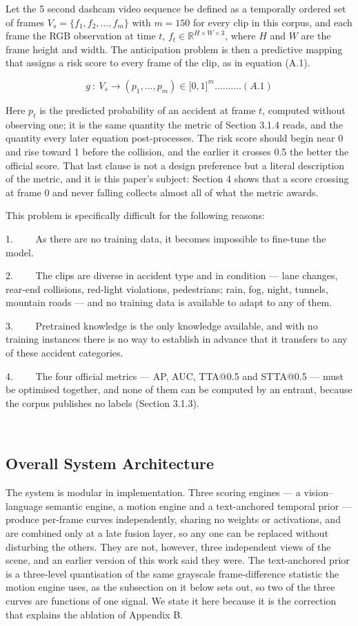 Let the 5 second dashcam video sequence be defined as a temporally ordered set of frames \(V_{s} = \{ f_{1},f_{2},\ldots,f_{m}\}\) with \(m = 150\) for every clip in this corpus, and each frame the RGB observation at time \(t\), \(f_{t} \in \mathbb{R}^{H \times W \times 3}\), where \(H\) and \(W\) are the frame height and width. The anticipation problem is then a predictive mapping that assigns a risk score to every frame of the clip, as in equation (A.1).

\[g\ :\ V_{s} \longrightarrow \left( p_{1},\ldots,p_{m} \right) \in \lbrack 0,1\rbrack^{m}\ldots\ldots\ldots.(A.1)\]

Here \(p_{t}\) is the predicted probability of an accident at frame \(t\), computed without observing one; it is the same quantity the metric of Section 3.1.4 reads, and the quantity every later equation post-processes. The risk score should begin near 0 and rise toward 1 before the collision, and the earlier it crosses 0.5 the better the official score. That last clause is not a design preference but a literal description of the metric, and it is this paper's subject: Section 4 shows that a score crossing at frame 0 and never falling collects almost all of what the metric awards.

This problem is specifically difficult for the following reasons:

1.~~~~ As there are no training data, it becomes impossible to fine-tune the model.

2.~~~~ The clips are diverse in accident type and in condition --- lane changes, rear-end collisions, red-light violations, pedestrians; rain, fog, night, tunnels, mountain roads --- and no training data is available to adapt to any of them.

3.~~~~ Pretrained knowledge is the only knowledge available, and with no training instances there is no way to establish in advance that it transfers to any of these accident categories.

4.~~~~ The four official metrics --- AP, AUC, TTA@0.5 and STTA@0.5 --- must be optimised together, and none of them can be computed by an entrant, because the corpus publishes no labels (Section 3.1.3).

~


\subsection{Overall System Architecture}

The system is modular in implementation. Three scoring engines --- a vision--language semantic engine, a motion engine and a text-anchored temporal prior --- produce per-frame curves independently, sharing no weights or activations, and are combined only at a late fusion layer, so any one can be replaced without disturbing the others. They are not, however, three independent views of the scene, and an earlier version of this work said they were. The text-anchored prior is a three-level quantisation of the same grayscale frame-difference statistic the motion engine uses, as the subsection on it below sets out, so two of the three curves are functions of one signal. We state it here because it is the correction that explains the ablation of Appendix B.

